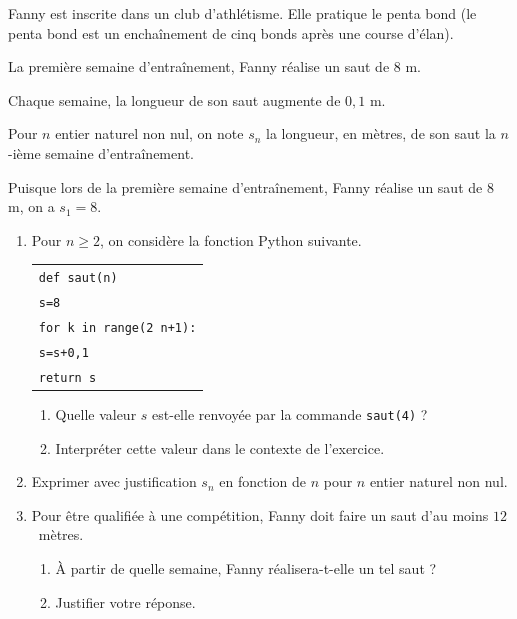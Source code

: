 \medskip

Fanny est inscrite dans un club d'athlétisme. Elle pratique le penta bond (le penta bond est un enchaînement de cinq bonds après une course d'élan).

La première semaine d'entraînement, Fanny réalise un saut de $8$ m.

Chaque semaine, la longueur de son saut augmente de $0,1$ m.

Pour $n$ entier naturel non nul, on note $s_n$ la longueur, en mètres, de son saut la $n$-ième semaine d'entraînement.

Puisque lors de la première semaine d'entraînement, Fanny réalise un saut de $8$ m, on a $s_1 = 8$.

\medskip

\begin{enumerate}
\item Pour $n \geqslant 2$, on considère la fonction Python suivante.

\begin{center}
\begin{tabularx}{0.4\linewidth}{|X|}\hline
\texttt{def saut(n)}\\
\quad  \texttt{s=8}\\
\quad  \texttt{for k in range(2~n+1):}\\
\qquad\quad \texttt{s=s+0,1}\\
\quad \texttt{return s}\\ \hline
\end{tabularx}
\end{center}

	\begin{enumerate}
		\item Quelle valeur $s$ est-elle renvoyée par la commande \texttt{saut(4)} ?
		\item Interpréter cette valeur dans le contexte de l'exercice.
	\end{enumerate}
\item Exprimer avec justification $s_n$ en fonction de $n$ pour $n$ entier naturel non nul.
\item Pour être qualifiée à une compétition, Fanny doit faire un saut d'au moins $12$~mètres.
	\begin{enumerate}
		\item À partir de quelle semaine, Fanny réalisera-t-elle un tel saut ? 
		\item Justifier votre réponse.
	\end{enumerate}
\end{enumerate}
